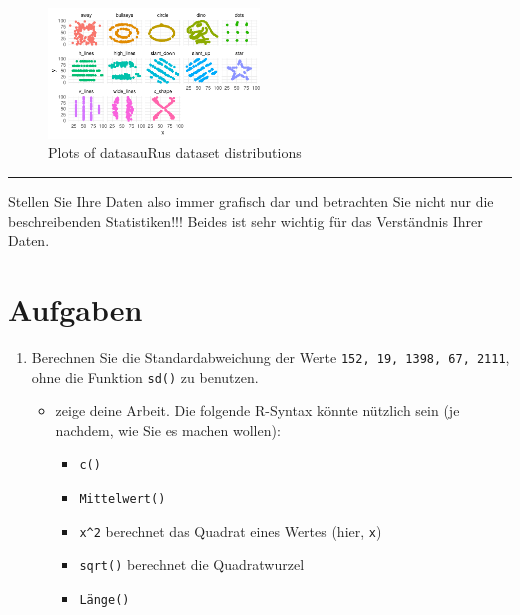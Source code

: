 \documentclass[
  letterpaper,
  DIV=11]{scrartcl}
\providecommand{\tightlist}{%
  \setlength{\itemsep}{0pt}\setlength{\parskip}{0pt}}\usepackage{longtable,booktabs,array}
\begin{document}
\begin{figure}

{\centering \includegraphics[width=0.5\textwidth,height=\textheight]{_descr_stats_DE_files/figure-pdf/fig-datasauRus-1.pdf}

}

\caption{\label{fig-datasauRus}Plots of datasauRus dataset
distributions}

\end{figure}

\begin{center}\rule{0.5\linewidth}{0.5pt}\end{center}

Stellen Sie Ihre Daten also immer grafisch dar und betrachten Sie nicht
nur die beschreibenden Statistiken!!! Beides ist sehr wichtig für das
Verständnis Ihrer Daten.

\hypertarget{aufgaben}{%
\section{Aufgaben}\label{aufgaben}}

\begin{enumerate}
\def\labelenumi{\arabic{enumi}.}
\tightlist
\item
  Berechnen Sie die Standardabweichung der Werte
  \texttt{152,\ 19,\ 1398,\ 67,\ 2111}, ohne die Funktion \texttt{sd()}
  zu benutzen.

  \begin{itemize}
  \tightlist
  \item
    zeige deine Arbeit. Die folgende R-Syntax könnte nützlich sein (je
    nachdem, wie Sie es machen wollen):

    \begin{itemize}
    \tightlist
    \item
      \texttt{c()}
    \item
      \texttt{Mittelwert()}
    \item
      \texttt{x\^{}2} berechnet das Quadrat eines Wertes (hier,
      \texttt{x})
    \item
      \texttt{sqrt()} berechnet die Quadratwurzel
    \item
      \texttt{Länge()}
    \end{itemize}
  \end{itemize}
\end{enumerate}
\end{document}
